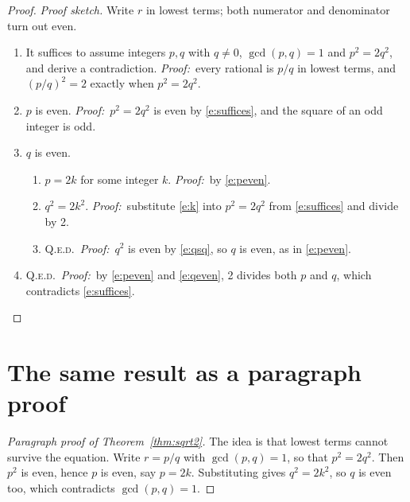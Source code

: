 \documentclass{article}
\theoremstyle{definition}
\newenvironment{steps}{%
  \renewcommand{\theenumi}{\ensuremath{\langle 1\rangle}\arabic{enumi}}%
  \renewcommand{\labelenumi}{\theenumi.}%
  \renewcommand{\theenumii}{\ensuremath{\langle 2\rangle}\arabic{enumii}}%
  \renewcommand{\labelenumii}{\theenumii.}%
  \renewcommand{\theenumiii}{\ensuremath{\langle 3\rangle}\arabic{enumiii}}%
  \renewcommand{\labelenumiii}{\theenumiii.}%
  \setlength{\leftmargini}{3.2em}\setlength{\leftmarginii}{3.2em}\setlength{\leftmarginiii}{3.2em}%
  \begin{enumerate}}{\end{enumerate}}
\newcommand{\sketch}[1]{\par\noindent\textit{Proof sketch.} #1\par\smallskip}
\newcommand{\pf}{\textit{Proof:}\ }
\newcommand{\qedstep}{\textsc{Q.e.d.}}
\begin{document}
\begin{proof}
\sketch{Write $r$ in lowest terms; both numerator and denominator turn out even.}
\begin{steps}
\item\label{e:suffices} It suffices to assume integers $p, q$ with $q \neq 0$,
  $\gcd(p, q) = 1$ and $p^2 = 2q^2$, and derive a contradiction.
  \pf every rational is $p/q$ in lowest terms, and $(p/q)^2 = 2$ exactly when $p^2 = 2q^2$.
\item\label{e:peven} $p$ is even.
  \pf $p^2 = 2q^2$ is even by \ref{e:suffices}, and the square of an odd integer is odd.
\item\label{e:qeven} $q$ is even.
  \begin{enumerate}
  \item\label{e:k} $p = 2k$ for some integer $k$. \pf by \ref{e:peven}.
  \item\label{e:qsq} $q^2 = 2k^2$. \pf substitute \ref{e:k} into $p^2 = 2q^2$ from
    \ref{e:suffices} and divide by 2.
  \item \qedstep\ \pf $q^2$ is even by \ref{e:qsq}, so $q$ is even, as in \ref{e:peven}.
  \end{enumerate}
\item \qedstep\ \pf by \ref{e:peven} and \ref{e:qeven}, 2 divides both $p$ and $q$,
  which contradicts \ref{e:suffices}.
\end{steps}
\end{proof}

\section*{The same result as a paragraph proof}

\begin{proof}[Paragraph proof of Theorem~\ref{thm:sqrt2}]
The idea is that lowest terms cannot survive the equation. Write $r = p/q$ with
$\gcd(p, q) = 1$, so that $p^2 = 2q^2$. Then $p^2$ is even, hence $p$ is even, say
$p = 2k$. Substituting gives $q^2 = 2k^2$, so $q$ is even too, which contradicts
$\gcd(p, q) = 1$.
\end{proof}
\end{document}
